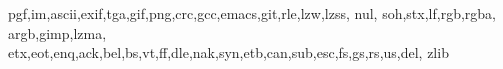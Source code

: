 \newcommand{\firstcharnode}[3]{  \node (#1) [hnode] {#2};
  \nodechar{#1}{\texttt{#3}}}

\newcommand{\restcharnode}[4]{
  \node (#1) [hnode,right=of #2] {#3};
  \nodechar{#1}{\texttt{#4}}
}

\newcommand*\algohack{\addtocontents{loa}{\vskip 9pt}}


\newcommand*\acronymstyle{\scshape}
\newcommand*\newacronym[1]{
  \expandafter\newcommand\csname#1\endcsname[1][]{{\acronymstyle#1}##1\xspace}}

\newcommand*{\newacronyms}{%
  \let\do\newacronym
  \docsvlist
}
\newacronyms{pgf,im,ascii,exif,tga,gif,png,crc,gcc,emacs,git,rle,lzw,lzss,
nul, soh,stx,lf,rgb,rgba, argb,gimp,lzma,
etx,eot,enq,ack,bel,bs,vt,ff,dle,nak,syn,etb,can,sub,esc,fs,gs,rs,us,del,
zlib}

\newcommand*{\lzone}{{\acronymstyle lz\oldstylenums{77}}\xspace}
\newcommand*{\lztwo}{{\acronymstyle lz\oldstylenums{78}}\xspace}

\newcommand*{\cret}{{\acronymstyle cr}\xspace}
\newcommand*{\htab}{{\acronymstyle ht}\xspace}
\newcommand*{\nullm}{{\acronymstyle null}\xspace}
\newcommand*{\lzfam}{{\acronymstyle lz}-family\xspace}
\newcommand*{\sout}{{\acronymstyle so}\xspace}
\newcommand*{\shiftin}{{\acronymstyle si}\xspace}
\newcommand*{\emed}{{\acronymstyle em}\xspace}

\newcommand*{\crlf}{{\acronymstyle crlf}\xspace}


\newcommand*{\dc}[1]{{\acronymstyle dc#1}\xspace}


\newcommand*{\crcst}{{\acronymstyle crc-16}\xspace}

\newcommand{\deflate}{Deflate\xspace}

\newenvironment{samepagew}{\begin{minipage}{\textwidth}}{\end{minipage}}


